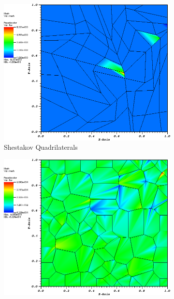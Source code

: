 \begin{figure}
{\begin{subfigure}[b]{0.465\textwidth}
	\end{subfigure}
}
{
	\vspace{3mm}
	\begin{subfigure}[b]{0.465\textwidth}
		\centering
		\label{subfig::shes_quad_me_k2_lin_sol}
		\includegraphics[width=\textwidth]{figures/sec_BF/quad_err_shesquad_Wach2.png}
		\caption{Shestakov Quadrilaterals}
	\end{subfigure}
	\hfill
	\begin{subfigure}[b]{0.465\textwidth}
		\centering
		\label{subfig::smooth_poly_me_k2_lin_sol}
		\includegraphics[width=\textwidth]{figures/sec_BF/quad_err_sinepoly_Wach2.png}

\end{subfigure}}
\end{figure}
